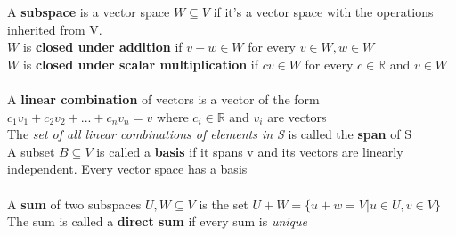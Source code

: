 \documentclass{article}
\begin{document}
A \textbf{subspace} is a vector space $W\subseteq V$ if it's a vector space with the operations inherited from V.\\
$W$ is \textbf{closed under addition} if $v+w\in W$ for every $v\in W,w\in W$\\
$W$ is \textbf{closed under scalar multiplication} if $cv\in W$ for every $c\in\mathds{R}$ and $v\in W$\\\\
A \textbf{linear combination} of vectors is a vector of the form $c_1v_1 + c_2v_2+...+c_nv_n = v$ where $c_i\in \mathds{R}$ and $v_i$ are vectors\\
The \textit{set of all linear combinations of elements in S} is called the \textbf{span} of S\\
A subset $B\subseteq V$ is called a \textbf{basis} if it spans v and its vectors are linearly independent. Every vector space has a basis\\\\
A \textbf{sum} of two subspaces $U,W\subseteq V$ is the set $U+W=\{u+w=V|u\in U, v\in V\}$
The sum is called a \textbf{direct sum }if every sum is \textit{unique}
\end{document}
